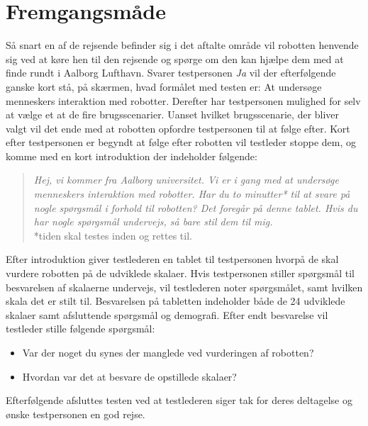\section{Fremgangsmåde}
\label{TestAfSkalaFremgangsmaade}
%
Så snart en af de rejsende befinder sig i det aftalte område vil robotten henvende sig ved at køre hen til den rejsende og spørge om den kan hjælpe dem med at finde rundt i Aalborg Lufthavn. Svarer testpersonen \textit{Ja} vil der efterfølgende ganske kort stå, på skærmen, hvad formålet med testen er: At undersøge menneskers interaktion med robotter.
Derefter har testpersonen mulighed for selv at vælge et at de fire brugsscenarier. Uanset hvilket brugsscenarie, der bliver valgt vil det ende med at robotten opfordre testpersonen til at følge efter. Kort efter testpersonen er begyndt at følge efter robotten vil testleder stoppe dem, og komme med en kort introduktion der indeholder følgende: 
%
\begin{quotation}
\noindent
\textit{Hej, vi kommer fra Aalborg universitet. Vi er i gang med at undersøge menneskers interaktion med robotter. Har du to minutter* til at svare på nogle spørgsmål i forhold til robotten? Det foregår på denne tablet. Hvis du har nogle spørgsmål undervejs, så bare stil dem til mig.}\\
*tiden skal testes inden og rettes til.
\end{quotation}
%
Efter introduktion giver testlederen en tablet til testpersonen hvorpå de skal vurdere robotten på de udviklede skalaer. Hvis testpersonen stiller spørgsmål til besvarelsen af skalaerne undervejs, vil testlederen noter spørgsmålet, samt hvilken skala det er stilt til. \blankline
%
Besvarelsen på tabletten indeholder både de 24 udviklede skalaer samt afsluttende spørgsmål og demografi. \blankline
%
Efter endt besvarelse vil testleder stille følgende spørgsmål: 
\begin{itemize}
	\item Var der noget du synes der manglede ved vurderingen af robotten? 
	\item Hvordan var det at besvare de opstillede skalaer? 
\end{itemize} \blankline
%
Efterfølgende afsluttes testen ved at testlederen siger tak for deres deltagelse og ønske testpersonen en god rejse.